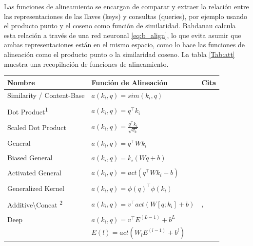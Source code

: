 Las funciones de alineamiento se encargan de comparar y extraer la relación entre las representaciones de las llaves (keys) y
consultas (queries), por ejemplo usando el producto punto y el coseno como función de similaridad.
Bahdanau calcula esta relación a través de una red neuronal \ref{eq:b_align}, lo que evita asumir
que ambas representaciones están en el mismo espacio, como lo hace las funciones de alineación
como el producto punto o la similaridad coseno. La tabla \ref{Tab:att} muestra una
recopilación de funciones de alineamiento.


\begin{table}[ht!]
\begin{center}
\begin{tabular}{@{}lll@{}}
\toprule
\textbf{Nombre} & \textbf{Función de Alineación} & \textbf{Cita} \\
\midrule
Similarity / Content-Base & $a(k_i, q) = sim(k_i, q)$ & \citeauthor*{DBLP:journals/corr/GravesWD14} \\ \\
Dot Product\textsuperscript{1} & $a(k_i, q) = q^\top k_i$ & \citeauthor*{DBLP:journals/corr/LuongPM15} \\ \\
Scaled Dot Product & $a(k_i, q) = \frac{q^\top k_i}{\sqrt{d_k}}$ & \citeauthor*{DBLP:journals/corr/VaswaniSPUJGKP17} \\ \\
General & $a(k_i, q) = q^\top W k_i$ & \citeauthor*{DBLP:journals/corr/LuongPM15} \\ \\
Biased General & $a(k_i, q) = k_i (Wq + b )$ & \citeauthor*{DBLP:journals/corr/SordoniBB16} \\ \\
Activated General & $a(k_i, q) = act(q^\top W k_i + b)$ & \citeauthor*{DBLP:journals/corr/abs-1709-00893} \\ \\
Generalized Kernel & $a(k_i, q) = \phi(q)^\top \phi(k_i)$ & \citeauthor*{DBLP:journals/corr/abs-2009-14794} \\ \\
Additive\textbackslash Concat \textsuperscript{2} & $a(k_i, q) = v^\top act(W[q;k_i]+ b)$ & \citeauthor*{bahdanau2016neural}, \citeauthor*{DBLP:journals/corr/LuongPM15} \\ \\
Deep & $a(k_i, q) = v^\top E^{(L-1)} + b^L$ & \citeauthor*{Pavlopoulos} \\
    & $E(l) = act(W_l E^{(l-1)} + b^l)$ &  \\

\end{tabular}
\end{center}
\end{table}
